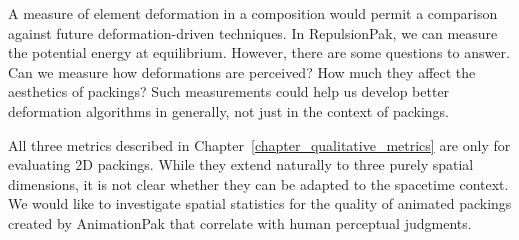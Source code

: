 A measure of element deformation in a composition would permit 
a comparison against future deformation-driven techniques.
In RepulsionPak, we can measure the potential energy at equilibrium.
However, there are some questions to answer.
Can we measure how deformations are perceived? How much they affect the aesthetics of packings?
Such measurements could help us develop better deformation algorithms in generally, not just in the context of packings.

All three metrics described in Chapter~\ref{chapter_qualitative_metrics} are only for evaluating 2D packings.
While they extend naturally to three purely spatial dimensions, 
it is not clear whether they can be adapted to the spacetime context.  
We would like to investigate spatial statistics for the quality of animated packings created by AnimationPak that correlate
with human perceptual judgments.

